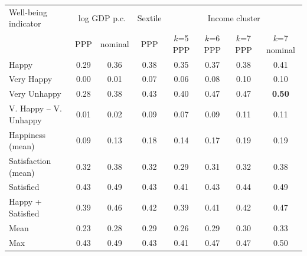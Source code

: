 \begin{tabular}{lccccccc}
\toprule
Well-being indicator & \multicolumn{2}{c}{log GDP p.c.} & Sextile & \multicolumn{4}{c}{Income cluster} \\ & PPP & nominal & PPP & $k$=5 PPP & $k$=6 PPP & $k$=7 PPP & $k$=7 nominal \\
\midrule
Happy & 0.29 & 0.36 & 0.38 & 0.35 & 0.37 & 0.38 & 0.41 \\
Very Happy & 0.00 & 0.01 & 0.07 & 0.06 & 0.08 & 0.10 & 0.10 \\
Very Unhappy & 0.28 & 0.38 & 0.43 & 0.40 & 0.47 & 0.47 & \textbf{0.50} \\
V. Happy -- V. Unhappy & 0.01 & 0.02 & 0.09 & 0.07 & 0.09 & 0.11 & 0.11 \\
Happiness (mean) & 0.09 & 0.13 & 0.18 & 0.14 & 0.17 & 0.19 & 0.19 \\
Satisfaction (mean) & 0.32 & 0.38 & 0.32 & 0.29 & 0.31 & 0.32 & 0.38 \\
Satisfied & 0.43 & 0.49 & 0.43 & 0.41 & 0.43 & 0.44 & 0.49 \\
Happy + Satisfied & 0.39 & 0.46 & 0.42 & 0.39 & 0.41 & 0.42 & 0.47 \\
\midrule
Mean & 0.23 & 0.28 & 0.29 & 0.26 & 0.29 & 0.30 & 0.33 \\
Max & 0.43 & 0.49 & 0.43 & 0.41 & 0.47 & 0.47 & 0.50 \\
\bottomrule
\end{tabular}
